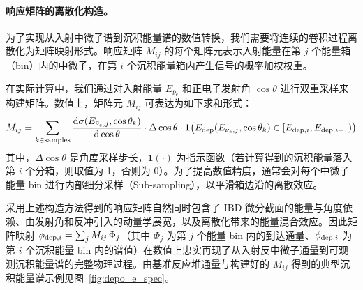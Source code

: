 \paragraph{响应矩阵的离散化构造。}
为了实现从入射中微子谱到沉积能量谱的数值转换，我们需要将连续的卷积过程离散化为矩阵映射形式。响应矩阵 $M_{ij}$ 的每个矩阵元表示入射能量在第 $j$ 个能量箱（bin）内的中微子，在第 $i$ 个沉积能量箱内产生信号的概率加权权重。

在实际计算中，我们通过对入射能量 $E_{\bar{\nu}_e}$ 和正电子发射角 $\cos\theta$ 进行双重采样来构建矩阵。数值上，矩阵元 $M_{ij}$ 可表达为如下求和形式：
\begin{equation}
M_{ij} = \sum_{k \in \text{samples}} \frac{\mathrm{d}\sigma(E_{\bar{\nu}_e,j}, \cos\theta_k)}{\mathrm{d}\cos\theta} \cdot \Delta\cos\theta \cdot \mathbf{1} \bigl( E_{\rm dep}(E_{\bar{\nu}_e,j}, \cos\theta_k) \in [E_{{\rm dep},i}, E_{{\rm dep},i+1}) \bigr)
\label{eq:Mij-sum}
\end{equation}
其中，$\Delta\cos\theta$ 是角度采样步长，$\mathbf{1}(\cdot)$ 为指示函数（若计算得到的沉积能量落入第 $i$ 个分箱，则取值为 1，否则为 0）。为了提高数值精度，通常会对每个中微子能量 bin 进行内部细分采样（Sub-sampling），以平滑箱边沿的离散效应。

采用上述构造方法得到的响应矩阵自然同时包含了 IBD 微分截面的能量与角度依赖、由发射角和反冲引入的动量学展宽，以及离散化带来的能量混合效应。因此矩阵映射 $\phi_{{\rm dep},i}=\sum_j M_{ij}\,\Phi_j$（其中 $\Phi_j$ 为第 $j$ 个能量 bin 内的到达通量、$\phi_{{\rm dep},i}$ 为第 $i$ 个沉积能量 bin 内的谱值）在数值上忠实再现了从入射反中微子通量到可观测沉积能量谱的完整物理过程。由基准反应堆通量与构建好的 $M_{ij}$ 得到的典型沉积能量谱示例见图~\ref{fig:depo_e_spec}。

